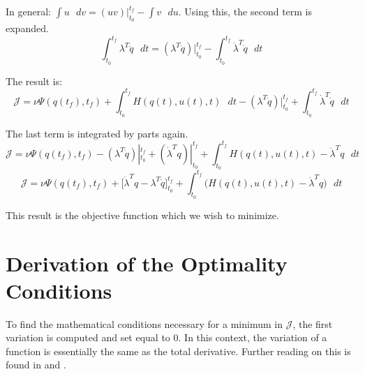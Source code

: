 In general:  $\int u \text{  }dv =  (uv)|_{t_0}^{t_f} - \int v \text{  }du $. Using this, the second term is expanded.
\begin{equation}
    \int_{t_0}^{t_f} \lambda^T \ddot q \text{  } dt  =  (\lambda^T \dot q) |_{t_0}^{t_f} - \int_{t_0}^{t_f} \dot \lambda^T  \dot q\text{  } dt
\end{equation}

The result is:
\begin{equation}
    \mathcal{  J  } = \nu \Psi ( q(t_f),t_f ) + \int_{t_0}^{t_f}  H(q(t),u(t),t) \text{  } dt -(\lambda^T \dot q) |_{t_0}^{t_f} + \int_{t_0}^{t_f} \dot \lambda^T  \dot q\text{  } dt
\end{equation}

The last term is integrated by parts again.
\begin{equation}
    \mathcal{  J  }= \nu \Psi ( q(t_f),t_f ) - (\lambda^T \dot q)|_{t_0}^{t_f} + (\dot \lambda^T  q)|_{t_0}^{t_f} + \int_{t_0}^{t_f}  H(q(t),u(t),t) - \ddot \lambda^T q \text{  }dt
\end{equation}
\begin{equation}
   \mathcal{  J  } = \nu \Psi ( q(t_f),t_f )  + \big[ \dot \lambda^T q - \lambda^T \dot q\big]_{t_0}^{t_f} + \int_{t_0}^{t_f}  \big( H(q(t),u(t),t) - \ddot \lambda^T q \big) \text{  } dt
\end{equation}

This result is the objective function which we wish to minimize.

\section{Derivation of the Optimality Conditions}

 To find the mathematical conditions necessary for a minimum in $\mathcal{  J  }$, the first variation is computed and set equal to 0. In this context, the variation of a function is essentially the same as the total derivative. Further reading on this is found in \cite{marion1995classical} and  \cite{cornelius1970variational}.


